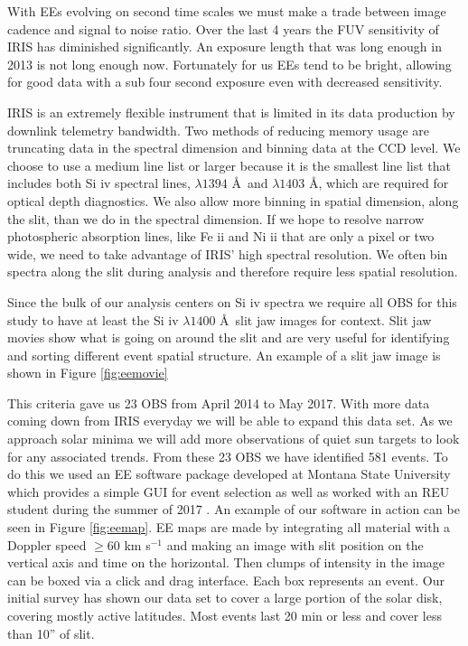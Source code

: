 \documentclass[]{aastex6}
\begin{document}
	With EEs evolving on second time scales we must make a trade between image cadence and signal to noise ratio.  Over the last 4 years the FUV sensitivity of IRIS has diminished significantly.  An exposure length that was long enough in 2013 is not long enough now.  Fortunately for us EEs tend to be bright, allowing for good data with a sub four second exposure even with decreased sensitivity.  
	
	IRIS is an extremely flexible instrument that is limited in its data production by downlink telemetry bandwidth.  Two methods of reducing memory usage are truncating data in the spectral dimension and binning data at the CCD level.  We choose to use a medium line list or larger because it is the smallest line list that includes both Si {\sc iv}  spectral lines, $\lambda 1394$ \AA\  and $\lambda 1403$ \AA, which are required for optical depth diagnostics.  We also allow more binning in spatial dimension, along the slit, than we do in the spectral dimension. If we hope to resolve narrow photospheric absorption lines, like Fe {\sc ii} and Ni {\sc ii} that are only a pixel or two wide, we need to take advantage of IRIS' high spectral resolution.  We often bin spectra along the slit during analysis and therefore require less spatial resolution.
	
	Since the bulk of our analysis centers on Si {\sc iv} spectra we require all OBS for this study to have at least the Si {\sc iv} $\lambda1400$ \AA \ slit jaw images for context.  Slit jaw movies show what is going on around the slit and are very useful for identifying and sorting different event spatial structure. An example of a slit jaw image is shown in Figure \ref{fig:eemovie}
	
	This criteria gave us 23 OBS from April 2014 to May 2017.  With more data coming down from IRIS everyday we will be able to expand this data set.  As we approach solar minima we will add more observations of quiet sun targets to look for any associated trends.  From these 23 OBS we have identified 581 events.  To do this we used an EE software package developed at Montana State University which provides a simple GUI for event selection as well as worked with an REU student during the summer of 2017 \citep{Bartz2018}.  An example of our software in action can be seen in Figure \ref{fig:eemap}.  EE maps are made by integrating all material with a Doppler speed $\geq60$ km s$^{-1}$ and making an image with slit position on the vertical axis and time on the horizontal.  Then clumps of intensity in the image can be boxed via a click and drag interface.  Each box represents an event. Our initial survey has shown our data set to cover a large portion of the solar disk, covering mostly active latitudes.  Most events last 20 min or less and cover less than 10'' of slit.
	
\end{document}
